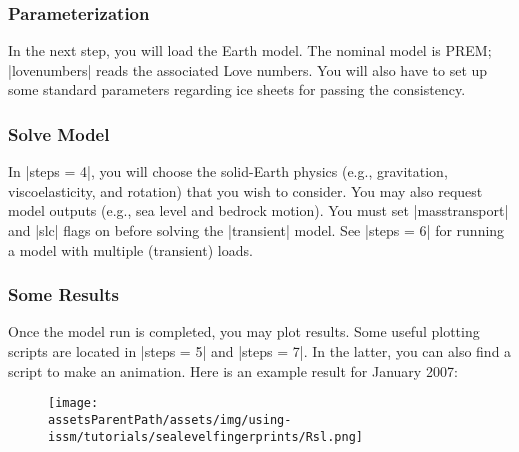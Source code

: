 \subsubsection{Parameterization} %
In the next step, you will load the Earth model. The nominal model is PREM; \lstinlinebg|lovenumbers| reads the associated Love numbers. You will also have to set up some standard parameters regarding ice sheets for passing the consistency.
\subsubsection{Solve Model} %
In \lstinlinebg|steps = 4|, you will choose the solid-Earth physics (e.g., gravitation, viscoelasticity, and rotation) that you wish to consider. You may also request model outputs (e.g., sea level and bedrock motion). You must set \lstinlinebg|masstransport| and \lstinlinebg|slc| flags on before solving the \lstinlinebg|transient| model. See \lstinlinebg|steps = 6| for running a model with multiple (transient) loads.
\subsubsection{Some Results} %
Once the model run is completed, you may plot results. Some useful plotting scripts are located in \lstinlinebg|steps = 5| and \lstinlinebg|steps = 7|. In the latter, you can also find a script to make an animation. Here is an example result for January 2007:
\begin{figure}[H]
	\begin{center}
		\texttt{[image: \\assetsParentPath/assets/img/using-issm/tutorials/sealevelfingerprints/Rsl.png]}
	\end{center}
\end{figure}

\clearpage %
